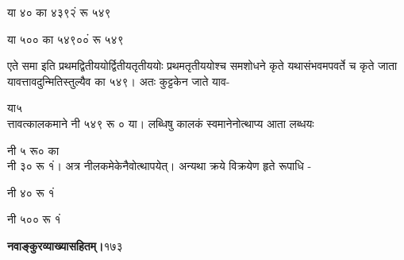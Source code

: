 \documentclass[11pt, openany]{book}
\begin{document}
\begin{sloppypar}
\begin{center}
या\hspace{0.1in} ४० का\hspace{0.1in} ४३९२ं रू ५४९

या ५०० का ५४९००ं रू ५४९
\end{center}

\hangindent=0.2in एते समा इति प्रथमद्वितीययोर्द्वितीयतृतीययोः प्रथमतृतीययोश्च समशोधने कृते यथासंभवमपवर्ते च कृते जाता यावत्तावदुन्मितिस्तुल्यैव का ५४९। अतः कुट्टकेन जाते याव-

\hspace{2.3in}या\hspace{0.2in}५\\

\hangindent=0.2in त्तावत्कालकमाने नी ५४९ रू ० या। लब्धिषु कालकं स्वमानेनोत्थाप्य आता लब्धयः

\hspace{1.05in}नी ५ रू० का\\

\hangindent=0.2in नी\hspace{0.1in} ३० रू १ं। अत्र नीलकमेकेनैवोत्थापयेत्। अन्यथा क्रये विक्रयेण हृते रूपाधि -

नी\hspace{0.1in} ४० रू १ं

नी ५०० रू १ं
\end{sloppypar}
\thispagestyle{empty}
\newpage

\onehalfspacing
\hspace{2in}\textbf{नवाङ्कुरव्याख्यासहितम्।}\hspace{2in}१७३

\vspace{5mm}
\end{document}
